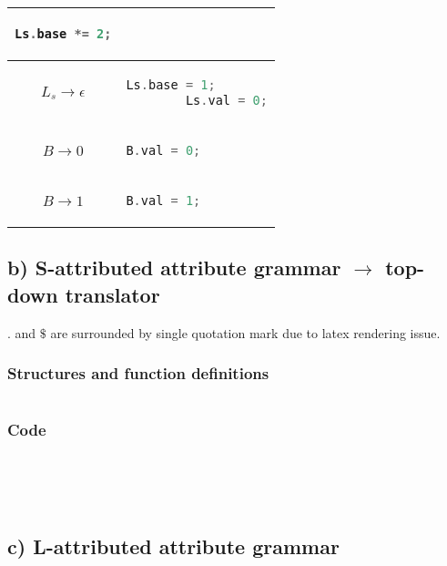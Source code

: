 \documentclass[12pt, A4]{article}
\begin{document}
\begin{tabular}{|c|l|}
\begin{lstlisting}[language=c]
        Ls.base *= 2;
        \end{lstlisting}
        \\ 
        \hline 
        $L_s \rightarrow \epsilon$& 
        \begin{lstlisting}[language=c]
        Ls.base = 1;
        Ls.val = 0;
        \end{lstlisting}
        \\ 
        \hline 
        $B \rightarrow 0$&
        \begin{lstlisting}[language=c]
        B.val = 0;
        \end{lstlisting}
        \\  
        \hline 
        $B \rightarrow 1$&
        \begin{lstlisting}[language=c]
        B.val = 1;
        \end{lstlisting}
        \\ 
        \hline 
    \end{tabular} 
	
    \newpage
	\subsection*{b) S-attributed attribute grammar $\rightarrow$ top-down translator}
    
    $.$ and $\$$ are surrounded by single quotation mark due to latex rendering issue.\\
    
    \subsubsection*{Structures and function definitions}
    \inputminted{c++}{QuestionB/node.cpp}
    
    \newpage
    \subsubsection*{Code}
    \inputminted{c++}{QuestionB/S.cpp}
    
    \newpage
    \inputminted{c++}{QuestionB/R.cpp}
    
    \newpage
    \inputminted{c++}{QuestionB/L.cpp}
    
    \newpage
    \inputminted{c++}{QuestionB/Ls.cpp}
    
    \newpage
    \inputminted{c++}{QuestionB/B.cpp}
    
    \newpage
	\subsection*{c) L-attributed attribute grammar}
    
\end{document}
